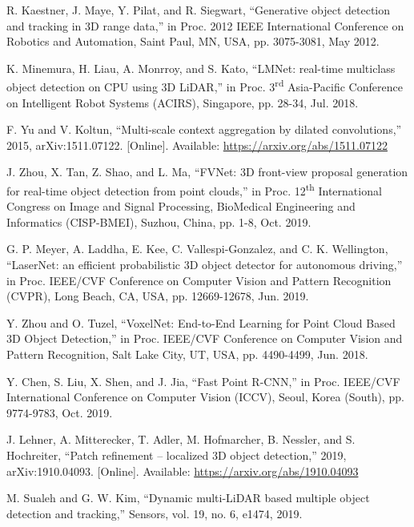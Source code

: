 \documentclass{ieeeaccess}
\begin{document}
\begin{thebibliography}{00}
 R. Kaestner, J. Maye, Y. Pilat, and R. Siegwart, ``Generative object detection and tracking in 3D range data,'' in Proc. 2012 IEEE International Conference on Robotics and Automation, Saint Paul, MN, USA, pp. 3075-3081, May 2012.

 K. Minemura, H. Liau, A. Monrroy, and S. Kato, ``LMNet: real-time multiclass object detection on CPU using 3D LiDAR,'' in Proc. 3\textsuperscript{rd} Asia-Pacific Conference on Intelligent Robot Systems (ACIRS), Singapore, pp. 28-34, Jul. 2018.

 F. Yu and V. Koltun, ``Multi-scale context aggregation by dilated convolutions,'' 2015, arXiv:1511.07122. [Online]. Available: \underline{https://arxiv.org/abs/1511.07122}

 J. Zhou, X. Tan, Z. Shao, and L. Ma, ``FVNet: 3D front-view proposal generation for real-time object detection from point clouds,'' in Proc. 12\textsuperscript{th} International Congress on Image and Signal Processing, BioMedical Engineering and Informatics (CISP-BMEI), Suzhou, China, pp. 1-8, Oct. 2019.

 G. P. Meyer, A. Laddha, E. Kee, C. Vallespi-Gonzalez, and C. K. Wellington, ``LaserNet: an efficient probabilistic 3D object detector for autonomous driving,'' in Proc. IEEE/CVF Conference on Computer Vision and Pattern Recognition (CVPR), Long Beach, CA, USA, pp. 12669-12678, Jun. 2019.

 Y. Zhou and O. Tuzel, ``VoxelNet: End-to-End Learning for Point Cloud Based 3D Object Detection,'' in Proc. IEEE/CVF Conference on Computer Vision and Pattern Recognition, Salt Lake City, UT, USA, pp. 4490-4499, Jun. 2018.


 Y. Chen, S. Liu, X. Shen, and J. Jia, ``Fast Point R-CNN,'' in Proc. IEEE/CVF International Conference on Computer Vision (ICCV), Seoul, Korea (South), pp. 9774-9783, Oct. 2019.

 J. Lehner, A. Mitterecker, T. Adler, M. Hofmarcher, B. Nessler, and S. Hochreiter, ``Patch refinement -- localized 3D object detection,'' 2019,  arXiv:1910.04093. [Online]. Available: \underline{https://arxiv.org/abs/1910.04093}

 M. Sualeh and G. W. Kim, ``Dynamic multi-LiDAR based multiple object detection and tracking,'' Sensors, vol. 19, no. 6, e1474, 2019.


\end{thebibliography}
\end{document}

